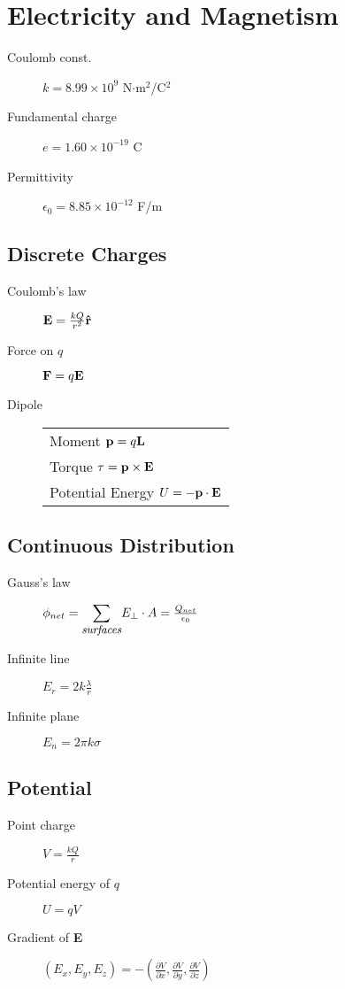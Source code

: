 \documentclass{article}
\newcommand{\bd}{\begin{description}}
\newcommand{\ed}{\end{description}}
\newcommand{\partderiv}[2]{\frac{\partial #1}{\partial #2}}
\newcommand{\e}[1]{\times 10^{#1}}
\begin{document}
\section{Electricity and Magnetism}
\bd
	\item[Coulomb const.] $ k = 8.99 \e{9} $ N$\cdot$m$^2$/C$^2$
	\item[Fundamental charge] $ e = 1.60 \e{-19} $ C
	\item[Permittivity] $ \epsilon_0 = 8.85 \e{-12} $ F/m
\ed 

\subsection{Discrete Charges}
\bd
 \item[Coulomb's law] $ {\bf E} = \frac{kQ}{r^2} {\bf \hat{r}} $
 \item[Force on $q$] $ {\bf F} = q {\bf E} $
 \item[Dipole]
  \begin{tabular}{l}
   Moment  $ {\bf p} = q {\bf L} $ \\
   Torque  $ {\bf \tau = p \times E} $ \\
   Potential Energy  $ U = - {\bf p \cdot E} $
  \end{tabular}
\ed

\subsection{Continuous Distribution}
\bd
 \item[Gauss's law] $ \phi_{net} = {\displaystyle \sum_{\mbox{\small \it surfaces}}} E_\bot \cdot A = \frac{Q_{net}}{\epsilon_0} $
 \item[Infinite line] $ E_r = 2 k \frac{\lambda}{r} $
 \item[Infinite plane] $ E_n = 2 \pi k \sigma $
\ed


\subsection{Potential}
\bd
 \item[Point charge] $ V = \frac{kQ}{r} $
 \item[Potential energy of $q$] $ U = q V $
 \item[Gradient of {\bf E}] $ \left(E_x,E_y,E_z\right) = - \left(\partderiv{V}{x}, \partderiv{V}{y}, \partderiv{V}{z}\right) $
\ed
\end{document}
